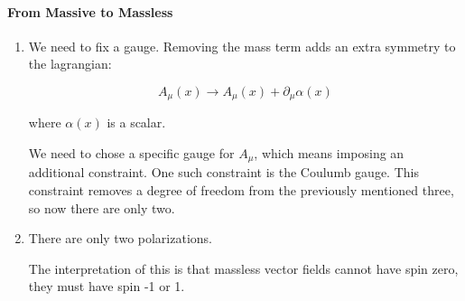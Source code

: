\documentclass{article}
\begin{document}
\paragraph{From Massive to Massless}
\begin{enumerate}
\item We need to fix a gauge.
Removing the mass term adds an extra symmetry to the lagrangian:

\[ A_\mu(x) \to A_\mu(x) + \partial_\mu \alpha(x) \]

where $\alpha(x)$ is a scalar.

We need to chose a specific gauge for $A_\mu$, which means
	imposing an additional constraint.
One such constraint is the Coulumb gauge.
This constraint removes a degree of freedom from the previously
	mentioned three, so now there are only two.
\item There are only two polarizations.

The interpretation of this is that massless vector fields cannot
	have spin zero, they must have spin -1 or 1.
\end{enumerate}
\end{document}

